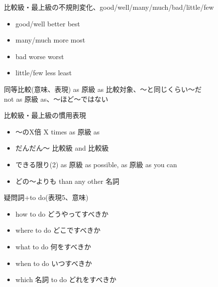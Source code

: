 \documentclass[10pt]{jsarticle}
\newcommand{\answer}[2]{{\color{orange}#2}}
\newcommand{\answer}[2]{\vspace{#1mm}}
\begin{document}
\begin{itembox}[l]{比較級・最上級の不規則変化、good/well/many/much/bad/little/few}
	\begin{multicols}{2}
		\begin{itemize}
			\item good/well \answer{5}{better best}
			\item many/much \answer{5}{more most}
			\item bad \answer{5}{worse worst}
			\item little/few \answer{5}{less least}
		\end{itemize}
	\end{multicols}
\end{itembox}


\begin{itembox}[l]{同等比較(意味、表現)}
	\answer{10}{as 原級 as 比較対象、〜と同じくらい〜だ
		\\not as 原級 as、〜ほど〜ではない}
\end{itembox}

\begin{itembox}[l]{比較級・最上級の慣用表現}
	\begin{multicols}{2}
		\begin{itemize}
			\item 〜のX倍 \answer{5}{X times as 原級 as}
			\item だんだん〜 \answer{5}{比較級 and 比較級}
			\item できる限り(2) \answer{5}{as 原級 as possible, as 原級 as you can}
			\item どの〜よりも \answer{5}{than any other 名詞}
		\end{itemize}
	\end{multicols}
\end{itembox}

\begin{itembox}[l]{疑問詞+to do(表現5、意味)}
	\answer{15}{
		\begin{multicols}{2}
			\begin{itemize}
				\item how to do どうやってすべきか
				\item where to do どこですべきか
				\item what to do 何をすべきか
				\item when to do いつすべきか
				\item which 名詞 to do どれをすべきか
			\end{itemize}
		\end{multicols}
	}
\end{itembox}
\end{document}
